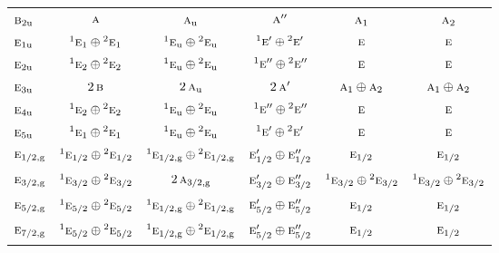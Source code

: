 \documentclass[10pt,a4paper]{article}
\numberwithin{equation}{section}
\newcommand{\irr}[1]{\text{\normalfont\scshape #1}}
\newcommand{\conjpair}[1]{{}^{#1}}
\newcommand{\ptag}[1]{\mathrm{#1}}
\begin{document}
{\begin{longtable}{@{}lccccc@{}}
$\irr{b}_{2\ptag{u}}$ & $\irr{a}$ & $\irr{a}_{\ptag{u}}$ & $\irr{a}''$ & $\irr{a}_{1}$ & $\irr{a}_{2}$\\
$\irr{e}_{1\ptag{u}}$ & $\conjpair{1}\irr{e}_{1}\oplus \conjpair{2}\irr{e}_{1}$ & $\conjpair{1}\irr{e}_{\ptag{u}}\oplus \conjpair{2}\irr{e}_{\ptag{u}}$ & $\conjpair{1}\irr{e}'\oplus \conjpair{2}\irr{e}'$ & $\irr{e}$ & $\irr{e}$\\
$\irr{e}_{2\ptag{u}}$ & $\conjpair{1}\irr{e}_{2}\oplus \conjpair{2}\irr{e}_{2}$ & $\conjpair{1}\irr{e}_{\ptag{u}}\oplus \conjpair{2}\irr{e}_{\ptag{u}}$ & $\conjpair{1}\irr{e}''\oplus \conjpair{2}\irr{e}''$ & $\irr{e}$ & $\irr{e}$\\
$\irr{e}_{3\ptag{u}}$ & $2\,\irr{b}$ & $2\,\irr{a}_{\ptag{u}}$ & $2\,\irr{a}'$ & $\irr{a}_{1}\oplus \irr{a}_{2}$ & $\irr{a}_{1}\oplus \irr{a}_{2}$\\
$\irr{e}_{4\ptag{u}}$ & $\conjpair{1}\irr{e}_{2}\oplus \conjpair{2}\irr{e}_{2}$ & $\conjpair{1}\irr{e}_{\ptag{u}}\oplus \conjpair{2}\irr{e}_{\ptag{u}}$ & $\conjpair{1}\irr{e}''\oplus \conjpair{2}\irr{e}''$ & $\irr{e}$ & $\irr{e}$\\
$\irr{e}_{5\ptag{u}}$ & $\conjpair{1}\irr{e}_{1}\oplus \conjpair{2}\irr{e}_{1}$ & $\conjpair{1}\irr{e}_{\ptag{u}}\oplus \conjpair{2}\irr{e}_{\ptag{u}}$ & $\conjpair{1}\irr{e}'\oplus \conjpair{2}\irr{e}'$ & $\irr{e}$ & $\irr{e}$\\
$\irr{e}_{1/2,\ptag{g}}$ & $\conjpair{1}\irr{e}_{1/2}\oplus \conjpair{2}\irr{e}_{1/2}$ & $\conjpair{1}\irr{e}_{1/2,\ptag{g}}\oplus \conjpair{2}\irr{e}_{1/2,\ptag{g}}$ & $\irr{e}_{1/2}'\oplus \irr{e}_{1/2}''$ & $\irr{e}_{1/2}$ & $\irr{e}_{1/2}$\\
$\irr{e}_{3/2,\ptag{g}}$ & $\conjpair{1}\irr{e}_{3/2}\oplus \conjpair{2}\irr{e}_{3/2}$ & $2\,\irr{a}_{3/2,\ptag{g}}$ & $\irr{e}_{3/2}'\oplus \irr{e}_{3/2}''$ & $\conjpair{1}\irr{e}_{3/2}\oplus \conjpair{2}\irr{e}_{3/2}$ & $\conjpair{1}\irr{e}_{3/2}\oplus \conjpair{2}\irr{e}_{3/2}$\\
$\irr{e}_{5/2,\ptag{g}}$ & $\conjpair{1}\irr{e}_{5/2}\oplus \conjpair{2}\irr{e}_{5/2}$ & $\conjpair{1}\irr{e}_{1/2,\ptag{g}}\oplus \conjpair{2}\irr{e}_{1/2,\ptag{g}}$ & $\irr{e}_{5/2}'\oplus \irr{e}_{5/2}''$ & $\irr{e}_{1/2}$ & $\irr{e}_{1/2}$\\
$\irr{e}_{7/2,\ptag{g}}$ & $\conjpair{1}\irr{e}_{5/2}\oplus \conjpair{2}\irr{e}_{5/2}$ & $\conjpair{1}\irr{e}_{1/2,\ptag{g}}\oplus \conjpair{2}\irr{e}_{1/2,\ptag{g}}$ & $\irr{e}_{5/2}'\oplus \irr{e}_{5/2}''$ & $\irr{e}_{1/2}$ & $\irr{e}_{1/2}$\\

\end{longtable}}
\end{document}
